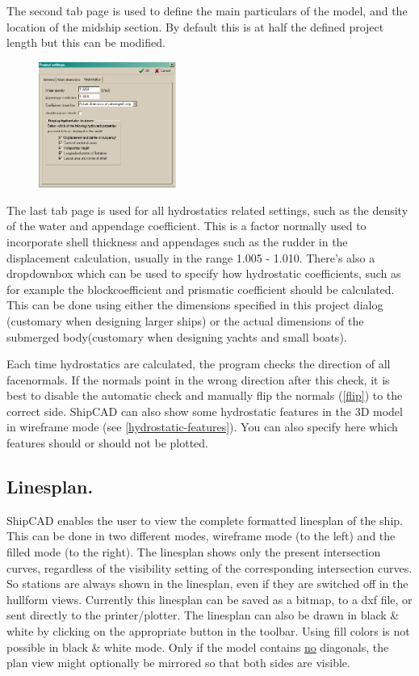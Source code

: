 \documentclass[12pt]{article}
\begin{document}
The second tab page is used to define the main particulars of the
model, and the location of the midship section. By default this is
at half the defined project length but this can be modified.

\begin{figure}
        \centering
        \includegraphics[width=0.4\textwidth,natwidth=394,natheight=361]{projectsettingsdialog-3.png}
        \caption{}
        \label{fig:projsettings3}
\end{figure}

The last tab page is used for all hydrostatics related settings, such
as the density of the water and appendage coefficient. This is a
factor normally used to incorporate shell thickness and appendages
such as the rudder in the displacement calculation, usually in the
range 1.005 - 1.010. There's also a dropdownbox which can be used to
specify how hydrostatic coefficients, such as for example the
blockcoefficient and prismatic coefficient should be calculated. This
can be done using either the dimensions specified in this project
dialog (customary when designing larger ships) or the actual
dimensions of the submerged body(customary when designing yachts and
small boats).

Each time hydrostatics are calculated, the program checks the
direction of all facenormals. If the normals point in the wrong
direction after this check, it is best to disable the automatic check
and manually flip the normals (\ref{flip}) to the correct side.  ShipCAD
can also show some hydrostatic features in the 3D model in wireframe
mode (see \ref{hydrostatic-features}). You can also specify here which
features should or should not be plotted.

\subsection{Linesplan.}
ShipCAD enables the user to view the complete formatted linesplan of
the ship. This can be done in two different modes, wireframe mode (to
the left) and the filled mode (to the right). The linesplan shows only
the present intersection curves, regardless of the visibility setting
of the corresponding intersection curves. So stations are always shown
in the linesplan, even if they are switched off in the hullform
views. Currently this linesplan can be saved as a bitmap, to a dxf
file, or sent directly to the printer/plotter. The linesplan can also
be drawn in black \& white by clicking on the appropriate button in
the toolbar. Using fill colors is not possible in black \& white
mode. Only if the model contains \underline{no} diagonals, the plan view might
optionally be mirrored so that both sides are visible.
\end{document}

